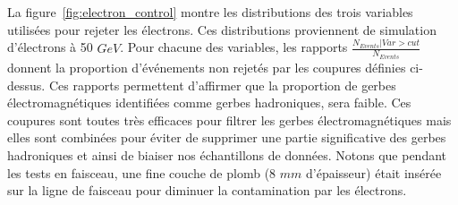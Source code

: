 La figure~\ref{fig:electron_control} montre les distributions des trois variables utilisées pour rejeter les électrons. Ces distributions proviennent de simulation d'électrons à 50 $GeV$. Pour chacune des variables, les rapports $\frac{N_{Events}|Var>cut}{N_{Events}}$ donnent la proportion d'événements non rejetés par les coupures définies ci-dessus. Ces rapports permettent d'affirmer que la proportion de gerbes électromagnétiques identifiées comme gerbes hadroniques, sera faible. Ces coupures sont toutes très efficaces pour filtrer les gerbes électromagnétiques mais elles sont combinées pour éviter de supprimer une partie significative des gerbes hadroniques et ainsi de biaiser nos échantillons de données. Notons que pendant les tests en faisceau, une fine couche de plomb (8 $mm$ d'épaisseur) était insérée sur la ligne de faisceau pour diminuer la contamination par les électrons. 
